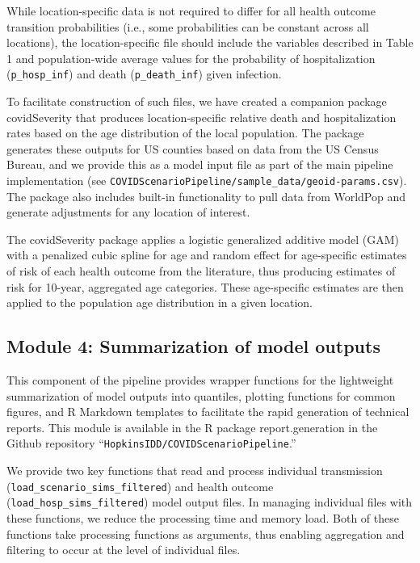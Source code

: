 While location-specific data is not required to differ for all health outcome transition probabilities (i.e., some probabilities can be constant across all locations), the location-specific file should include the variables described in Table 1 and population-wide average values for the probability of hospitalization (\verb|p_hosp_inf|) and death (\verb|p_death_inf|) given infection.

To facilitate construction of such files, we have created a companion package covidSeverity that produces location-specific relative death and hospitalization rates based on the age distribution of the local population\cite{Lauer:HopkinsIDDCovidSeverityInitial:2020}. The package generates these outputs for US counties based on data from the US Census Bureau, and we provide this as a model input file as part of the main pipeline implementation (see \verb|COVIDScenarioPipeline/sample_data/geoid-params.csv|). The package also includes built-in functionality to pull data from WorldPop and generate adjustments for any location of interest.

The covidSeverity package applies a logistic generalized additive model (GAM) with a penalized cubic spline for age and random effect for age-specific estimates of risk of each health outcome from the literature, thus producing estimates of risk for 10-year, aggregated age categories. These age-specific estimates are then applied to the population age distribution in a given location.

\subsection{Module 4: Summarization of model outputs}
This component of the pipeline provides wrapper functions for the lightweight summarization of model outputs into quantiles, plotting functions for common figures, and R Markdown templates to facilitate the rapid generation of technical reports. This module is available in the R package report.generation in the Github repository “\verb|HopkinsIDD/COVIDScenarioPipeline|.”

We provide two key functions that read and process individual transmission (\verb|load_scenario_sims_filtered|) and health outcome (\verb|load_hosp_sims_filtered|) model output files. In managing individual files with these functions, we reduce the processing time and memory load. Both of these functions take processing functions as arguments, thus enabling aggregation and filtering to occur at the level of individual files.

